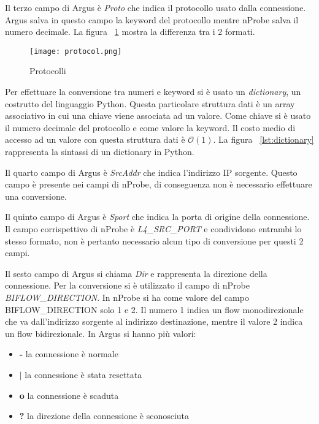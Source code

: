 \documentclass[../main.tex]{subfiles}
\begin{document}
Il terzo campo di Argus è \textit{Proto} che indica il protocollo usato dalla connessione. Argus salva in questo campo la keyword del protocollo mentre nProbe salva il numero decimale. La figura ~\ref{fig:protocol} mostra la differenza tra i 2 formati.
\begin{figure}[H]
				\centering
\texttt{[image: protocol.png]}
				\caption{Protocolli}
				\label{fig:protocol}
\end{figure}
Per effettuare la conversione tra numeri e keyword si è usato un \textit{dictionary}, un costrutto del linguaggio Python. Questa particolare struttura dati è un array associativo in cui una chiave viene associata ad un valore. Come chiave si è usato il numero decimale del protocollo e come valore la keyword. Il costo medio di accesso ad un valore con questa struttura dati è $\mathcal{O}(1)$. La figura ~\ref{lst:dictionary} rappresenta la sintassi di un dictionary in Python.


Il quarto campo di Argus è \textit{SrcAddr} che indica l'indirizzo IP sorgente. Questo campo è presente nei campi di nProbe, di conseguenza non è necessario effettuare una conversione. 

Il quinto campo di Argus è \textit{Sport} che indica la porta di origine della connessione. Il campo corrispettivo di nProbe è \textit{L4\_SRC\_PORT} e condividono entrambi lo stesso formato, non è pertanto necessario alcun tipo di conversione per questi 2 campi.

Il sesto campo di Argus si chiama \textit{Dir} e rappresenta la direzione della connessione. Per la conversione si è utilizzato il campo di nProbe \textit{BIFLOW\_DIRECTION}. In nProbe si ha come valore del campo BIFLOW\_DIRECTION solo 1 e 2. Il numero 1 indica un flow monodirezionale che va dall'indirizzo sorgente al indirizzo destinazione, mentre il valore 2 indica un flow bidirezionale. In Argus si hanno più valori:
\begin{itemize}
				\item \textbf{-} la connessione è normale
				\item $\boldsymbol|$ la connessione è stata resettata
				\item \textbf{o} la connessione è scaduta
				\item \textbf{?} la direzione della connessione è sconosciuta
\end{itemize}
\end{document}
